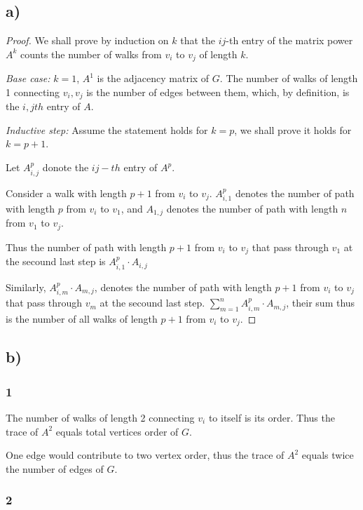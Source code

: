 \documentclass[12pt]{article}
\begin{document}
\subsection*{a)}
\begin{proof}
    We shall prove by induction on $k$ that the $ij$-th entry of the matrix power $A^k$ counts the number of walks from $v_i$ to $v_j$ of length $k$.
    
    \emph{Base case:} $k=1$, $A^1$ is the adjacency matrix of $G$. The number of walks of length 1 connecting $v_i, v_j$ is the number of edges between them, which, by definition, is the $i,jth$ entry of $A$. 
    
    \emph{Inductive step:} Assume the statement holds for $k=p$, we shall prove it holds for $k=p+1$. 
    
    Let $A^p_{i,j}$ donote the $ij-th$ entry of $A^p$. 

    Consider a walk with length $p+1$ from $v_i$ to $v_j$. $A^p_{i, 1}$ denotes the number of path with length $p$ from $v_i$ to $v_1$, and $A_{1, j}$ denotes the number of path with length $n$ from $v_1$ to $v_j$.

    Thus the number of path with length $p+1$ from $v_i$ to $v_j$ that pass through $v_1$ at the secound last step is $A^p_{i,1} \cdot A_{i,j}$
     
    Similarly, $A^p_{i, m} \cdot A_{m,j}$, denotes the number of path with length $p+1$ from $v_i$ to $v_j$ that pass through $v_m$ at the secound last step. $\sum^{n}_{m=1} A^p_{i,m}\cdot A_{m,j} $, their sum thus is the number of all walks of length $p+1$ from $v_i$ to $v_j$.
    
\end{proof}

\subsection*{b)}

\subsubsection*{1}

The number of walks of length 2 connecting $v_i$ to itself is its order. Thus the trace of $A^2$ equals total vertices order of $G$.

One edge would contribute to two vertex order, thus the trace of $A^2$ equals twice the number of edges of $G$.

\subsubsection*{2}
\end{document}
